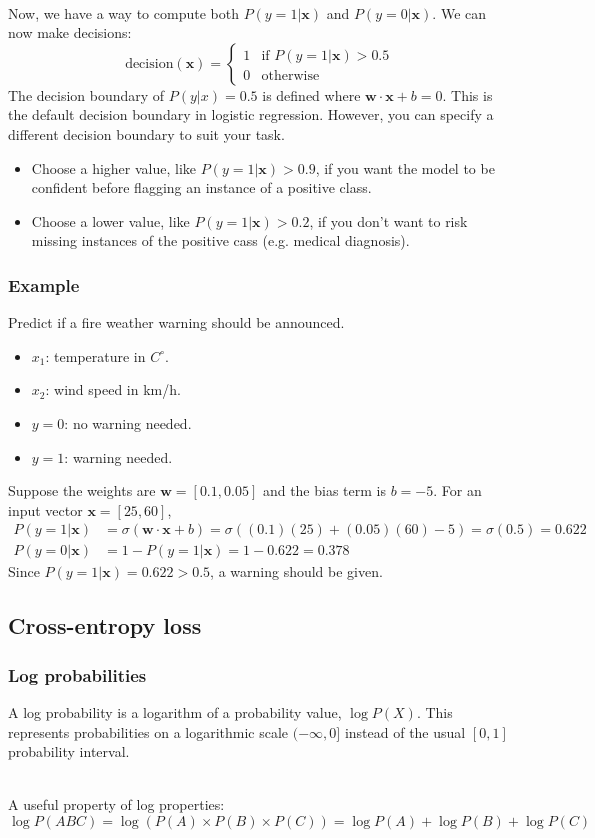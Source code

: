 \documentclass[11pt]{article}
\begin{document}
$\quad$\\[-1em]
Now, we have a way to compute both $P(y=1|\mathbf{x})$ and $P(y=0|\mathbf{x})$. We can now make decisions:
$$
\text{decision}(\mathbf{x})=\begin{cases}
    1 & \text{if }P(y=1|\mathbf{x})>0.5 \\
    0 & \text{otherwise}
\end{cases}
$$
The decision boundary of $P(y|x)=0.5$ is defined where $\mathbf{w}\cdot\mathbf{x}+b=0$. This is the default decision boundary in logistic regression. However, you can specify a different decision boundary to suit your task.
\begin{itemize}
    \item Choose a higher value, like $P(y=1|\mathbf{x})>0.9$, if you want the model to be confident before flagging an instance of a positive class.
    \item Choose a lower value, like $P(y=1|\mathbf{x})>0.2$, if you don't want to risk missing instances of the positive cass (e.g. medical diagnosis).
\end{itemize}

\subsubsection{Example}
Predict if a fire weather warning should be announced.
\begin{itemize}
    \item $x_1$: temperature in $C^\circ$.
    \item $x_2$: wind speed in km/h.
    \item $y=0$: no warning needed.
    \item $y=1$: warning needed.
\end{itemize}
Suppose the weights are $\mathbf{w}=[0.1,0.05]$ and the bias term is $b=-5$. For an input vector $\mathbf{x}=[25,60]$,
\begin{align*}
    P(y=1|\mathbf{x})&=\sigma(\mathbf{w}\cdot\mathbf{x}+b)=\sigma((0.1)(25)+(0.05)(60)-5)=\sigma(0.5)=0.622 \\
    P(y=0|\mathbf{x})&=1-P(y=1|\mathbf{x})=1-0.622=0.378
\end{align*}
Since $P(y=1|\mathbf{x})=0.622>0.5$, a warning should be given.

\subsection{Cross-entropy loss}
\subsubsection{Log probabilities}
\begin{definition}
    A log probability is a logarithm of a probability value, $\log P(X)$. This represents probabilities on a logarithmic scale $(-\infty,0]$ instead of the usual $[0,1]$ probability interval.
\end{definition}
$\quad$\\[-1em]
A useful property of log properties:
$$
\log P(ABC)=\log(P(A)\times P(B)\times P(C))=\log P(A)+\log P(B)+\log P(C)
$$
\end{document}

